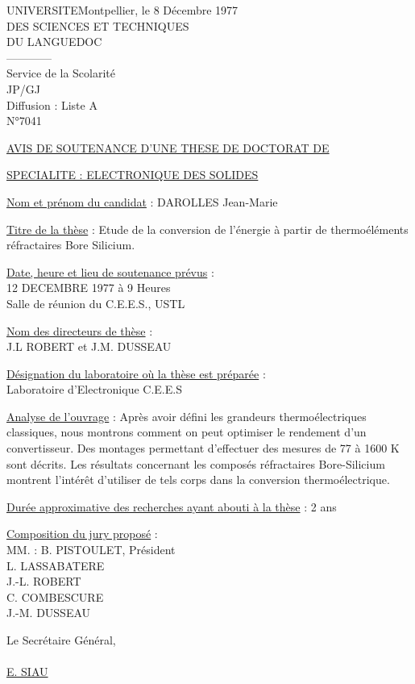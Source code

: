 UNIVERSITE\hfill Montpellier, le 8 Décembre 1977\\
DES SCIENCES ET TECHNIQUES\\
DU LANGUEDOC\\
------------\\
Service de la Scolarité\\
JP/GJ\\
Diffusion : Liste A\\
N°7041

\uline{AVIS DE SOUTENANCE D'UNE THESE DE DOCTORAT DE}

\uline{SPECIALITE : ELECTRONIQUE DES SOLIDES}

\uline{Nom et prénom du candidat} : DAROLLES Jean-Marie

\uline{Titre de la thèse} : Etude de la conversion de l'énergie à partir de thermoéléments réfractaires Bore Silicium.

\uline{Date, heure et lieu de soutenance prévus} :\\
12 DECEMBRE 1977 à 9 Heures\\
Salle de réunion du C.E.E.S., USTL

\uline{Nom des directeurs de thèse} :\\
J.L ROBERT et J.M. DUSSEAU

\uline{Désignation du laboratoire où la thèse est préparée} :\\
Laboratoire d'Electronique C.E.E.S

\uline{Analyse de l'ouvrage} : Après avoir défini les grandeurs thermoélectriques classiques, nous montrons comment on peut optimiser le rendement d'un convertisseur. Des montages permettant d'effectuer des mesures de 77 à 1600 K sont décrits. Les résultats concernant les composés réfractaires Bore-Silicium montrent l'intérêt d'utiliser de tels corps dans la conversion thermoélectrique.

\uline{Durée approximative des recherches ayant abouti à la thèse} : 2 ans

\uline{Composition du jury proposé} :\\
MM. : B. PISTOULET, Président\\
L. LASSABATERE\\
J.-L. ROBERT\\
C. COMBESCURE\\
J.-M. DUSSEAU

Le Secrétaire Général,\\
\\
\uline{E. SIAU}

